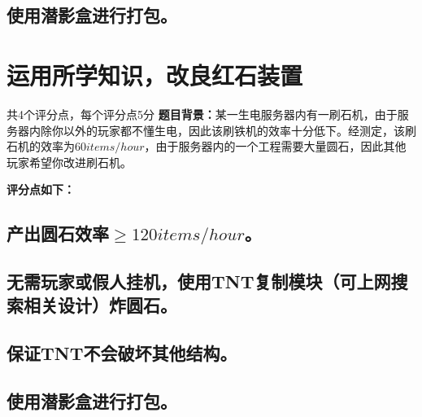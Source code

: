 \documentclass{exampaper}
\begin{document}
            \subsection{使用潜影盒进行打包。}

        \section{运用所学知识，改良红石装置}{共4个评分点，每个评分点5分} %
            \textbf{题目背景：}某一生电服务器内有一刷石机，由于服务器内除你以外的玩家都不懂生电，因此该刷铁机的效率十分低下。经测定，该刷石机的效率为$60items/hour$，由于服务器内的一个工程需要大量圆石，因此其他玩家希望你改进刷石机。

            \textbf{评分点如下：}

            \subsection{产出圆石效率$\geq 120items/hour$。}

            \subsection{无需玩家或假人挂机，使用TNT复制模块（可上网搜索相关设计）炸圆石。}

            \subsection{保证TNT不会破坏其他结构。}

            \subsection{使用潜影盒进行打包。}
\end{document}
